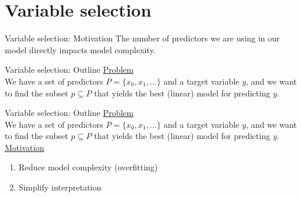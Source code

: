 \documentclass[8pt]{beamer}
\begin{document}
    \section{Variable selection}

    \begin{frame}{Variable selection: Motivation}
        \centering
        The number of predictors we are using in our model directly impacts model complexity.
    \end{frame}

    \begin{frame}[t]{Variable selection: Outline} %
        \underline{Problem}\\
        We have a set of predictors $P=\{x_0, x_1, ...\}$ and a target variable $y$, and we want to find the subset $p \subseteq P$ that yields the best (linear) model for predicting $y$.\\
    \end{frame}

    \begin{frame}[t]{Variable selection: Outline} %
        \underline{Problem}\\
        We have a set of predictors $P=\{x_0, x_1, ...\}$ and a target variable $y$, and we want to find the subset $p \subseteq P$ that yields the best (linear) model for predicting $y$.\\
        \vspace{0.25cm}
        \underline{Motivation}\\
        \begin{enumerate}
            \item Reduce model complexity (overfitting)
            \item Simplify interpretation
        \end{enumerate}
    \end{frame}

\end{document}
